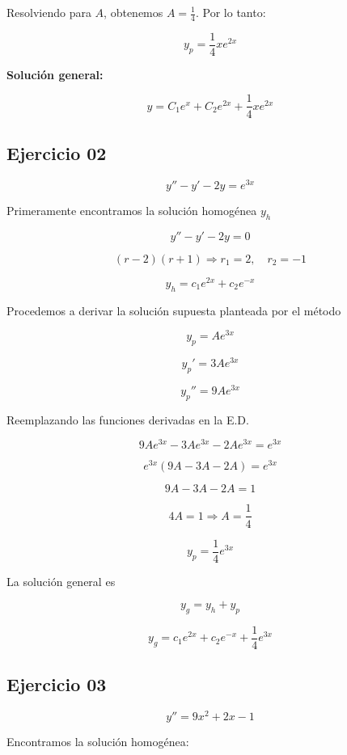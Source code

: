 Resolviendo para \( A \), obtenemos \( A = \frac{1}{4} \). Por lo tanto:

\begin{equation}
y_p = \frac{1}{4} x e^{2x}
\end{equation}

\textbf{Solución general:}

\begin{equation}
y = C_1 e^x + C_2 e^{2x} + \frac{1}{4} x e^{2x}
\end{equation}



\subsection{Ejercicio 02}

\[
y'' - y' - 2y = e^{3x}
\]

Primeramente encontramos la solución homogénea \( y_h \)

\[
y'' - y' - 2y = 0
\]

\[
( r - 2)( r + 1) \Rightarrow r_{1} = 2, \quad r_{2} = -1
\]

\[
y_h = c_{1} e^{2x} + c_{2} e^{-x}
\]

Procedemos a derivar la solución supuesta planteada por el método

\[
y_p = A e^{3x}
\]

\[
y_p' = 3A e^{3x}
\]

\[
y_p'' = 9A e^{3x}
\]

Reemplazando las funciones derivadas en la E.D.

\[
9A e^{3x} - 3A e^{3x} - 2A e^{3x} = e^{3x}
\]

\[
e^{3x} (9A - 3A - 2A) = e^{3x}
\]

\[
9A - 3A - 2A = 1
\]

\[
4A = 1 \Rightarrow A = \frac{1}{4}
\]

\[
y_p = \frac{1}{4} e^{3x}
\]

La solución general es

\[
y_g = y_h + y_p
\]

\[
y_g = c_{1} e^{2x} + c_{2} e^{-x} + \frac{1}{4} e^{3x}
\]


\subsection*{Ejercicio 03}

\[
y'' = 9x^{2} + 2x - 1
\]

Encontramos la solución homogénea:

